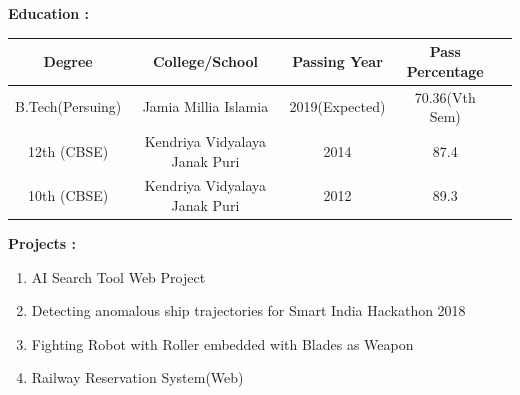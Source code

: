 \documentclass[11pt,a4paper]{article}
\begin{document}
\hfill
\begin{multicols}{2}
	\begin{minipage}{0.15\paperwidth}
		\textbf{Education : }
	\end{minipage}
	\begin{minipage}{0.7\paperwidth}
		\renewcommand{\arraystretch}{2}
		\begin{tabular}{|c|c|c|c|c|}
			\hline
			Degree&College\//School&Passing Year&Pass Percentage\\
			\hline
			B.Tech(Persuing)&Jamia Millia Islamia&2019(Expected)&70.36(Vth Sem)\\
			\hline
			12th (CBSE)&Kendriya Vidyalaya Janak Puri&2014&87.4\\
			\hline
			10th (CBSE)&Kendriya Vidyalaya Janak Puri&2012&89.3\\
			\hline
		\end{tabular}
	\end{minipage}
\end{multicols}
\hfill
\begin{multicols}{2}
	\begin{minipage}{0.15\paperwidth}
		\textbf{Projects :}
	\end{minipage}
	\begin{minipage}{0.7\paperwidth}
		\begin{enumerate}
			\item AI Search Tool Web Project 
			\item Detecting anomalous ship trajectories for Smart India Hackathon 2018
			\item Fighting Robot with Roller embedded with Blades as Weapon
			\item Railway Reservation System(Web)
		\end{enumerate}
	\end{minipage}
\end{multicols}
\hfill
\end{document}
